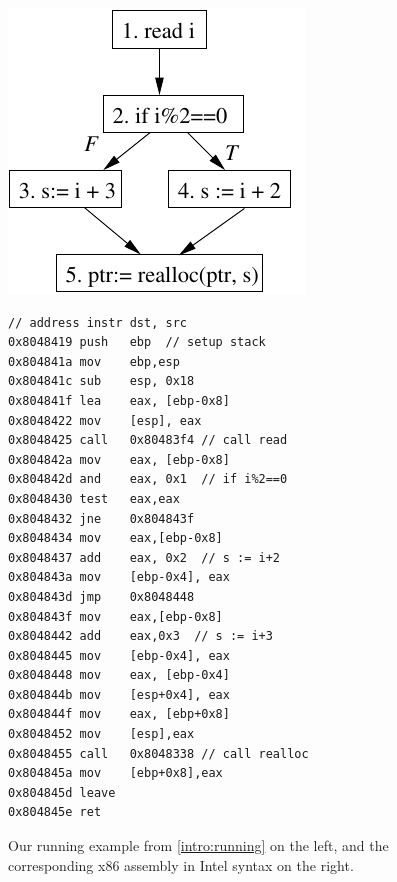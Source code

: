\begin{figure}
\begin{minipage}[c]{.45\linewidth}
  \includegraphics{fig/running-example}
  \label{vine:running-example-fig}
\end{minipage}
\begin{scriptsize}
\begin{minipage}[c]{.45\linewidth}
\begin{lstlisting}
// address instr dst, src
0x8048419 push   ebp  // setup stack
0x804841a mov    ebp,esp
0x804841c sub    esp, 0x18
0x804841f lea    eax, [ebp-0x8]
0x8048422 mov    [esp], eax 
0x8048425 call   0x80483f4 // call read
0x804842a mov    eax, [ebp-0x8]
0x804842d and    eax, 0x1  // if i%2==0
0x8048430 test   eax,eax
0x8048432 jne    0x804843f
0x8048434 mov    eax,[ebp-0x8]
0x8048437 add    eax, 0x2  // s := i+2
0x804843a mov    [ebp-0x4], eax
0x804843d jmp    0x8048448
0x804843f mov    eax,[ebp-0x8]
0x8048442 add    eax,0x3  // s := i+3
0x8048445 mov    [ebp-0x4], eax
0x8048448 mov    eax, [ebp-0x4]
0x804844b mov    [esp+0x4], eax
0x804844f mov    eax, [ebp+0x8]
0x8048452 mov    [esp],eax
0x8048455 call   0x8048338 // call realloc
0x804845a mov    [ebp+0x8],eax
0x804845d leave  
0x804845e ret    
\end{lstlisting}
\end{minipage}
\end{scriptsize}
\caption{Our running example from \ref{intro:running} on the  left, and the
  corresponding x86 assembly in Intel syntax on the right.}
\label{fig:running-asm}
\end{figure}

